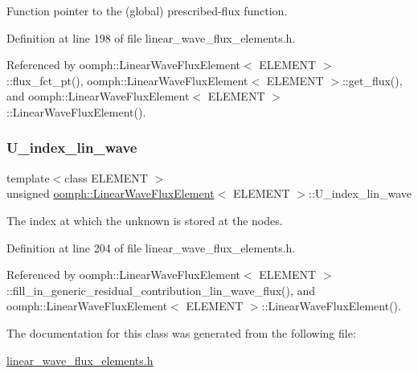 Function pointer to the (global) prescribed-\/flux function. 



Definition at line 198 of file linear\+\_\+wave\+\_\+flux\+\_\+elements.\+h.



Referenced by oomph\+::\+Linear\+Wave\+Flux\+Element$<$ E\+L\+E\+M\+E\+N\+T $>$\+::flux\+\_\+fct\+\_\+pt(), oomph\+::\+Linear\+Wave\+Flux\+Element$<$ E\+L\+E\+M\+E\+N\+T $>$\+::get\+\_\+flux(), and oomph\+::\+Linear\+Wave\+Flux\+Element$<$ E\+L\+E\+M\+E\+N\+T $>$\+::\+Linear\+Wave\+Flux\+Element().

\mbox{\label{classoomph_1_1LinearWaveFluxElement_a6a5e0e000ee602797262490bc49c49e2}} 
\subsubsection{\texorpdfstring{U\+\_\+index\+\_\+lin\+\_\+wave}{U\_index\_lin\_wave}}
{\footnotesize\ttfamily template$<$class E\+L\+E\+M\+E\+NT $>$ \\
unsigned \hyperlink{classoomph_1_1LinearWaveFluxElement}{oomph\+::\+Linear\+Wave\+Flux\+Element}$<$ E\+L\+E\+M\+E\+NT $>$\+::U\+\_\+index\+\_\+lin\+\_\+wave\hspace{0.3cm}{\ttfamily [private]}}



The index at which the unknown is stored at the nodes. 



Definition at line 204 of file linear\+\_\+wave\+\_\+flux\+\_\+elements.\+h.



Referenced by oomph\+::\+Linear\+Wave\+Flux\+Element$<$ E\+L\+E\+M\+E\+N\+T $>$\+::fill\+\_\+in\+\_\+generic\+\_\+residual\+\_\+contribution\+\_\+lin\+\_\+wave\+\_\+flux(), and oomph\+::\+Linear\+Wave\+Flux\+Element$<$ E\+L\+E\+M\+E\+N\+T $>$\+::\+Linear\+Wave\+Flux\+Element().



The documentation for this class was generated from the following file\+:\begin{DoxyCompactItemize}
\item 
\hyperlink{linear__wave__flux__elements_8h}{linear\+\_\+wave\+\_\+flux\+\_\+elements.\+h}\end{DoxyCompactItemize}
